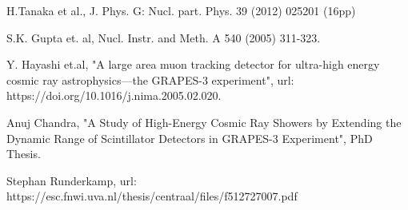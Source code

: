 \documentclass[12pt]{article}
\begin{document}
\begin{thebibliography}{9}

 H.Tanaka et al., J. Phys. G: Nucl. part. Phys. 39 (2012) 025201 (16pp) 

 S.K. Gupta et. al, Nucl. Instr. and Meth. A 540 (2005) 311-323.
 
 Y. Hayashi et.al, "A large area muon tracking detector for ultra-high energy cosmic ray astrophysics—the GRAPES-3 experiment", url: https://doi.org/10.1016/j.nima.2005.02.020.

 Anuj Chandra, "A Study of High-Energy Cosmic Ray Showers by Extending the Dynamic Range of Scintillator Detectors in GRAPES-3 Experiment", PhD Thesis.

 Stephan Runderkamp, url: https://esc.fnwi.uva.nl/thesis/centraal/files/f512727007.pdf

\end{thebibliography}
\end{document}
